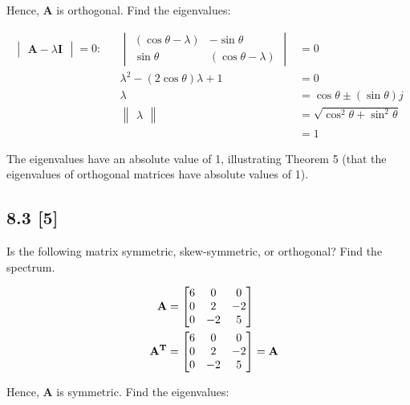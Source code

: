 \documentclass{article}
\begin{document}
Hence, \textbf{A} is orthogonal.  Find the eigenvalues:

\begin{align}
    \label{eq:6}
    \begin{vmatrix} \textbf{A} - \lambda\textbf{I}\end{vmatrix} = 0: &&\begin{vmatrix} 
    (\cos\theta - \lambda) & -\sin\theta\\
    \sin\theta & (\cos\theta - \lambda)
    \end{vmatrix} &= 0
    \\
    \label{eq:7}
    && \lambda^2 -(2\cos\theta)\lambda + 1 &= 0
    \\
    \label{eq:8}
    && \lambda &= \cos\theta \pm (\sin\theta)j
    \\
    \label{eq:9}
    && \begin{Vmatrix} \lambda \end{Vmatrix} &= \sqrt{\cos^2 \theta + \sin^2 \theta}
    \\
    \label{eq:10}
    && &= 1
\end{align}

The eigenvalues have an absolute value of 1, illustrating Theorem 5 (that the eigenvalues of orthogonal matrices have absolute values of 1).

\subsection*{8.3 [5]}
\setcounter{equation}{0}

Is the following matrix symmetric, skew-symmetric, or orthogonal?  Find the spectrum.

\begin{align}
    \label{eq:1}
    && \textbf{A} &= \begin{bmatrix}
    6 & 0 & 0\\
    0 & 2 & -2\\
    0 & -2 & 5
    \end{bmatrix}
    \\
    \label{eq:2}
    && \textbf{A\textsuperscript{T}} &= \begin{bmatrix}
    6 & 0 & 0\\
    0 & 2 & -2\\
    0 & -2 & 5
    \end{bmatrix} = \textbf{A}
\end{align}

Hence, \textbf{A} is symmetric.  Find the eigenvalues:
\end{document}
